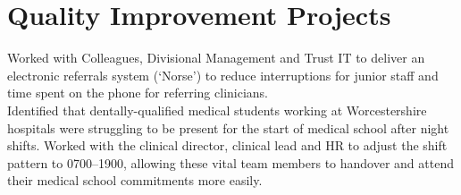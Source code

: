 \section*{Quality Improvement Projects}

 Worked with Colleagues, Divisional Management and Trust IT to deliver an electronic referrals system (`Norse') to reduce interruptions for junior staff and time spent on the phone for referring clinicians.
\\
 Identified that dentally-qualified medical students working at Worcestershire hospitals were struggling to be present for the start of medical school after night shifts. Worked with the clinical director, clinical lead and HR to adjust the shift pattern to 0700--1900, allowing these vital team members to handover and attend their medical school commitments more easily.

